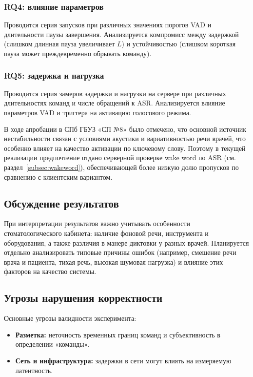 \subsubsection{RQ4: влияние параметров}
Проводится серия запусков при различных значениях порогов VAD и длительности паузы завершения.
Анализируется компромисс между задержкой (слишком длинная пауза увеличивает $L$) и устойчивостью (слишком короткая пауза может преждевременно обрывать команду).

\subsubsection{RQ5: задержка и нагрузка}
Проводится серия замеров задержки и нагрузки на сервере при различных длительностях команд и числе обращений к ASR.
Анализируется влияние параметров VAD и триггера на активацию голосового режима.

В ходе апробации в СПб ГБУЗ «СП №8» было отмечено, что основной источник нестабильности связан с условиями акустики и вариативностью речи врачей, что особенно влияет на качество активации по ключевому слову.
Поэтому в текущей реализации предпочтение отдано серверной проверке wake word по ASR (см. раздел~\ref{subsec:wakeword}), обеспечивающей более низкую долю пропусков по сравнению с клиентским вариантом.

\subsection{Обсуждение результатов}
\label{subsec:exp_discussion}

При интерпретации результатов важно учитывать особенности стоматологического кабинета: наличие фоновой речи, инструмента и оборудования, а также различия в манере диктовки у разных врачей.
Планируется отдельно анализировать типовые причины ошибок (например, смешение речи врача и пациента, тихая речь, высокая шумовая нагрузка) и влияние этих факторов на качество системы.

\subsection{Угрозы нарушения корректности}
\label{subsec:exp_threats}

Основные угрозы валидности эксперимента:
\begin{itemize}
    \item \textbf{Разметка:} неточность временных границ команд и субъективность в определении «команды».
    \item \textbf{Сеть и инфраструктура:} задержки в сети могут влиять на измеряемую латентность.
\end{itemize}
